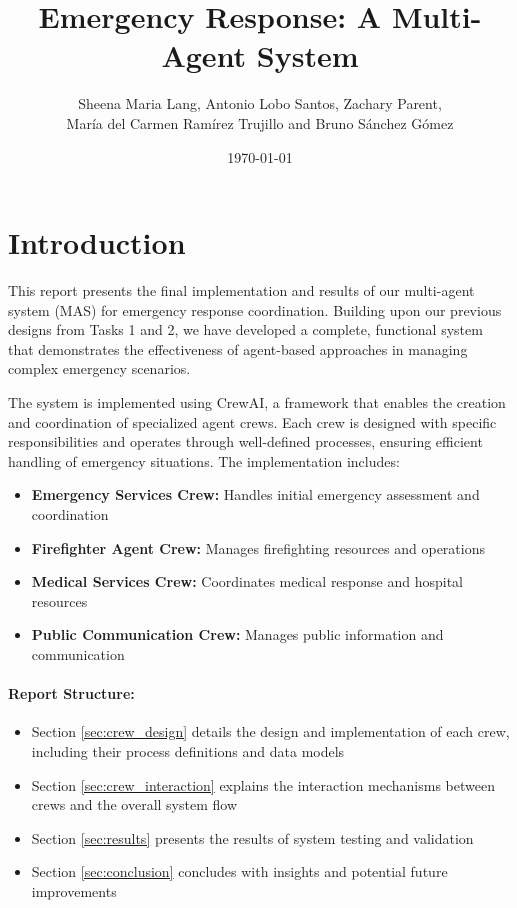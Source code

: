 \documentclass[a4paper]{article}
\title{Emergency Response: A Multi-Agent System}
\author{Sheena Maria Lang, Antonio Lobo Santos, Zachary Parent, \\ María del Carmen Ramírez Trujillo and Bruno Sánchez Gómez}
\date{\today}
\begin{document}
\maketitle
\tableofcontents
\newpage

\section{Introduction}
This report presents the final implementation and results of our multi-agent system (MAS) for emergency response coordination. Building upon our previous designs from Tasks 1 and 2, we have developed a complete, functional system that demonstrates the effectiveness of agent-based approaches in managing complex emergency scenarios.

The system is implemented using CrewAI, a framework that enables the creation and coordination of specialized agent crews. Each crew is designed with specific responsibilities and operates through well-defined processes, ensuring efficient handling of emergency situations. The implementation includes:

\begin{itemize}
    \item \textbf{Emergency Services Crew:} Handles initial emergency assessment and coordination
    \item \textbf{Firefighter Agent Crew:} Manages firefighting resources and operations
    \item \textbf{Medical Services Crew:} Coordinates medical response and hospital resources
    \item \textbf{Public Communication Crew:} Manages public information and communication
\end{itemize}

\paragraph{Report Structure:}
\begin{itemize}
    \item Section \ref{sec:crew_design} details the design and implementation of each crew, including their process definitions and data models
    \item Section \ref{sec:crew_interaction} explains the interaction mechanisms between crews and the overall system flow
    \item Section \ref{sec:results} presents the results of system testing and validation
    \item Section \ref{sec:conclusion} concludes with insights and potential future improvements
\end{itemize}
\end{document}
